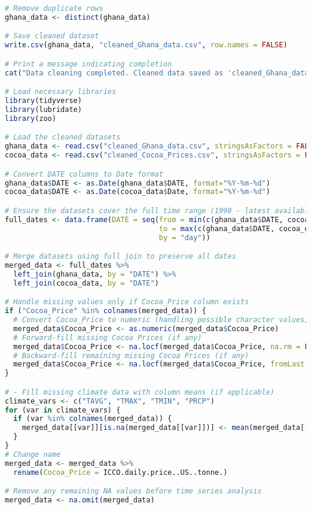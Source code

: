 \begin{lstlisting}[language=R]
# Remove duplicate rows
ghana_data <- distinct(ghana_data)

# Save cleaned dataset
write.csv(ghana_data, "cleaned_Ghana_data.csv", row.names = FALSE)

# Print a message indicating completion
cat("Data cleaning completed. Cleaned data saved as 'cleaned_Ghana_data.csv'\n")

# Load necessary libraries
library(tidyverse)
library(lubridate)
library(zoo)

# Load the cleaned datasets
ghana_data <- read.csv("cleaned_Ghana_data.csv", stringsAsFactors = FALSE)
cocoa_data <- read.csv("cleaned_Cocoa_Prices.csv", stringsAsFactors = FALSE)

# Convert DATE columns to Date format
ghana_data$DATE <- as.Date(ghana_data$DATE, format="%Y-%m-%d")
cocoa_data$DATE <- as.Date(cocoa_data$Date, format="%Y-%m-%d")

# Ensure the datasets cover the full time range (1990 - latest available)
full_dates <- data.frame(DATE = seq(from = min(c(ghana_data$DATE, cocoa_data$DATE), na.rm = TRUE),
                                    to = max(c(ghana_data$DATE, cocoa_data$DATE), na.rm = TRUE),
                                    by = "day"))

# Merge datasets using full join to preserve all dates
merged_data <- full_dates %>%
  left_join(ghana_data, by = "DATE") %>%
  left_join(cocoa_data, by = "DATE")

# Handle missing values only if Cocoa_Price column exists
if ("Cocoa_Price" %in% colnames(merged_data)) {
  # Convert Cocoa_Price to numeric (handling possible character values)
  merged_data$Cocoa_Price <- as.numeric(merged_data$Cocoa_Price)
  # Forward-fill missing Cocoa Prices (if any)
  merged_data$Cocoa_Price <- na.locf(merged_data$Cocoa_Price, na.rm = FALSE, na.action = na.pass)
  # Backward-fill remaining missing Cocoa Prices (if any)
  merged_data$Cocoa_Price <- na.locf(merged_data$Cocoa_Price, fromLast = TRUE, na.rm = FALSE, na.action = na.pass)
}

# - Fill missing climate data with column means (if applicable)
climate_vars <- c("TAVG", "TMAX", "TMIN", "PRCP")
for (var in climate_vars) {
  if (var %in% colnames(merged_data)) {
    merged_data[[var]][is.na(merged_data[[var]])] <- mean(merged_data[[var]], na.rm = TRUE)
  }
}
# Change name
merged_data <- merged_data %>%
  rename(Cocoa_Price = ICCO.daily.price..US..tonne.) 

# Remove any remaining NA values before time series analysis
merged_data <- na.omit(merged_data)


\end{lstlisting}
